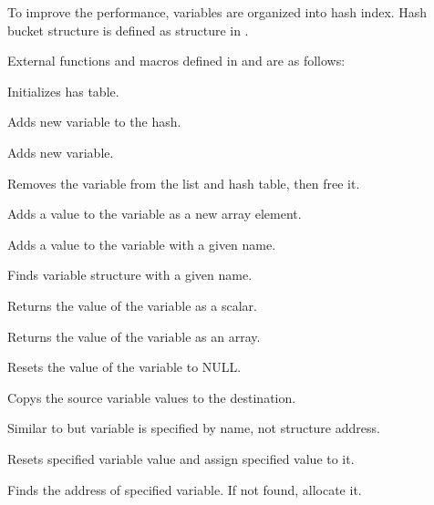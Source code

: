   To improve the performance, variables are organized into hash index.
  Hash bucket structure is defined as  structure in .
  
  External functions and macros defined in  and  are as follows:
  
  
      Initializes has table.
  
  
      Adds new variable to the hash.
  
  
      Adds new variable.
  
  
      Removes the variable from the list and hash table, then free it.
  
  
      Adds a value to the variable as a new array element.
  
  
      Adds a value to the variable with a given name.
  
  
      Finds variable structure with a given name.
  
  
      Returns the value of the variable as a scalar.
  
  
      Returns the value of the variable as an array.
  
  
      Resets the value of the variable to NULL.
  
  
      Copys the source variable values to the destination.
  
  
      Similar to  but variable is specified by name, not structure address.
  
  
      Resets specified variable value and assign specified value to it.
  
  
      Finds the address of specified variable.
      If not found, allocate it.
  
